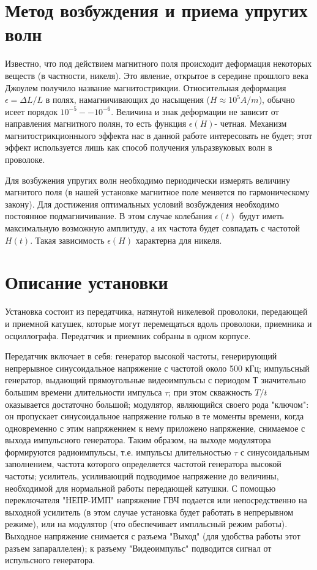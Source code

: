 \section{Метод возбуждения и приема упругих волн}

Известно, что под действием магнитного поля происходит деформация некоторых веществ (в частности, никеля). Это явление, открытое в середине прошлого века Джоулем получило название магнитострикции. Относительная деформация $\epsilon=\Delta L/L$ в полях, намагничивающих до насыщения ($H\approx10^5 A/m$), обычно исеет порядок $10^{-5}--10^{-6}$. Величина и знак деформации не зависит от направления магнитного полян, то есть функция $\epsilon(H)$- четная. Механизм магнитострикционныого эффекта нас в данной работе интересовать не будет; этот эффект используется лишь как способ получения ульразвуковых волн в проволоке.

Для возбужения упругих волн необходимо периодически измерять величину магнитого поля (в нашей установке магнитное поле меняется по гармоническому закону). Для достижения оптимальных условий возбуждения необходимо постоянное подмагничивание. В этом случае колебания $\epsilon(t)$ будут иметь максимальную возможную амплитуду, а их частота будет совпадать с частотой $H(t)$. Такая зависимость $\epsilon(H)$ характерна для никеля.

\section{Описание установки}

Установка состоит из передатчика, натянутой никелевой проволоки, передающей и приемной катушек, которые могут перемещаться вдоль проволоки, приемника и осциллографа. Передатчик и приемник собраны в одном корпусе.

Передатчик включает в себя: генератор высокой частоты, генерирующий непрерывное синусоидальное напряжение с частотой около 500 кГц; импульсный генератор, выдающий прямоугольные видеоимпульсы с периодом Т значительно большим времени длительности импульса $\tau$; при этом скважность $T/t$ оказывается достаточно большой; модулятор, являющийся своего рода "ключом": он пропускает синусоидальное напряжение голько в те моменты времени, когда одновременно с этим напряжением к нему приложено напряжение, снимаемое с выхода импульсного генератора. Таким образом, на выходе модулятора формируются радиоимпульсы, т.е. импульсы длительностью $\tau$ с синусоидальным заполнением, частота которого определяется частотой генератора высокой частоты; усилитель, усиливающий подводимое напряжение до величины, необходимой для нормальной работы передающей катушки.
С помощью переключателя "НЕПР-ИМП" напряжение ГВЧ подается или непосредственно на выходной усилитель (в этом случае установка будет работать в непрерывном режиме), или на модулятор (что обеспечивает имплльсный режим работы). Выходное напряжение снимается с разъема "Выход" (для удобства работы этот разъем запараллелен); к разъему "Видеоимпульс" подводится сигнал от испульсного генератора.

